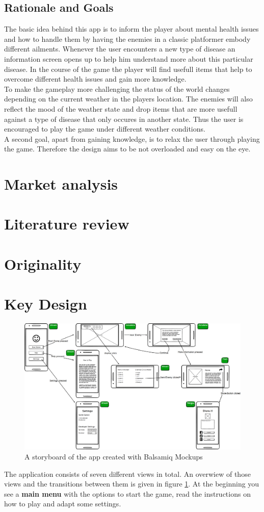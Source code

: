 \documentclass{sigchi}
\begin{document}
\subsection{Rationale and Goals}
The basic idea behind this app is to inform the player about mental health issues and how to handle them by having the enemies in a classic platformer embody different ailments. Whenever the user encounters a new type of disease an information screen opens up to help him understand more about this particular disease. In the course of the game the player will find usefull items that help to overcome different health issues and gain more knowledge.\\
To make the gameplay more challenging the status of the world changes depending on the current weather in the players location. The enemies will also reflect the mood of the weather state and drop items that are more usefull against a type of disease that only occures in another state. Thus the user is encouraged to play the game under different weather conditions.\\
A second goal, apart from gaining knowledge, is to relax the user through playing the game. Therefore the design aims to be not overloaded and easy on the eye.

\section{Market analysis}
\section{Literature review}
\section{Originality}
\section{Key Design}
\begin{figure}
\label{fig:storyboard}
	\centering
	\includegraphics[width=7in]{figures/UIDesign/Storyboard.png}
	\caption{A storyboard of the app created with Balsamiq Mockups}
\end{figure}
The application consists of seven different views in total. An overwiew of those views and the transitions between them is given in figure \ref{fig:storyboard}. At the beginning you see a \textbf{main menu} with the options to start the game, read the instructions on how to play and adapt some settings.
\end{document}
